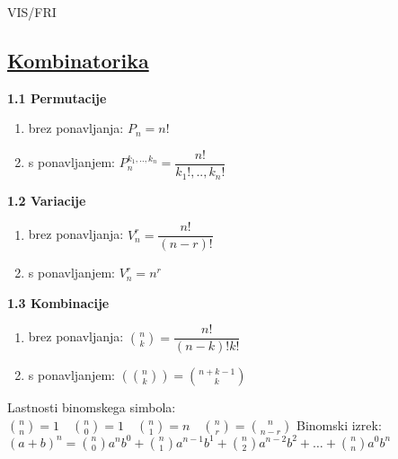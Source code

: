 \documentclass{article}
\begin{document}
\begin{center}
	{\small VIS/FRI \par}
\end{center}

\begin{multicols}{2}

	

	\section{\underline{Kombinatorika}}


	\textbf{1.1 Permutacije}
	\begin{small}
		\begin{enumerate}
			\item brez ponavljanja: $P_{n} = n!$
			\item s ponavljanjem: $P_{n}^{k_{1},..,k_{n}} = \dfrac{n!}{k_{1}!,..,k_{n}!}$
		\end{enumerate}
	\end{small}

	\textbf{1.2 Variacije}
	\begin{small}
		\begin{enumerate}
			\item brez ponavljanja: $V_{n}^{r} = \dfrac{n!}{(n - r)!}$
			\item s ponavljanjem: $V_{n}^{r} = n^{r}$
		\end{enumerate}
	\end{small}

	\textbf{1.3 Kombinacije}
	\begin{small}
		\begin{enumerate}
			\item brez ponavljanja: ${n\choose k} = \dfrac{n!}{(n - k)! k!}$
			\item s ponavljanjem: $({n\choose k}) = {n + k - 1\choose k}$
		\end{enumerate}
		\begin{center}
			Lastnosti binomskega simbola:
			\begin{math}
				{n \choose n} = 1 \quad
				{n \choose 0} = 1 \quad
				{n \choose 1} = n \quad
				{n \choose r} = {n \choose n - r}
			\end{math}
			Binomski izrek:\\
			\begin{math}
				(a + b)^{n} =
					{n \choose 0} a^{n} b^{0} + {n \choose 1} a^{n - 1} b^{1} +
				{n \choose 2} a^{n - 2} b^{2} + \dots + {n \choose n} a^{0} b^{n}
			\end{math}


\end{center}
\end{small}
\end{multicols}
\end{document}
